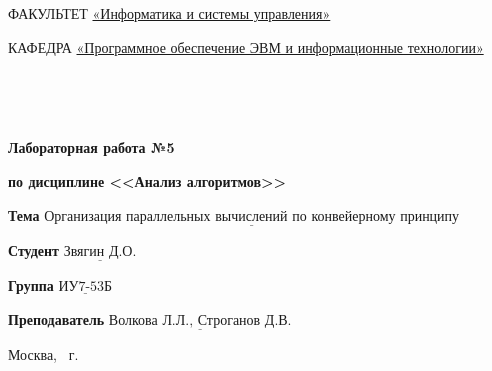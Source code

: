 \begin{titlepage}
	\noindent ФАКУЛЬТЕТ \underline{«Информатика и системы управления»}
	
	\noindent КАФЕДРА \underline{«Программное обеспечение ЭВМ и информационные технологии»}
	
	\
	
	\
	
	\begin{center}
	\noindent\begin{minipage}{1.0\textwidth}\centering
	\Large\textbf{Лабораторная работа №5}
	
	\textbf{по дисциплине <<Анализ алгоритмов>>}
	
	\end{minipage}
	\end{center}
	\noindent\textbf{Тема} $\underline{\text{Организация параллельных вычислений по конвейерному принципу}}$
	
	\noindent\textbf{Студент} $\underline{\text{Звягин Д.О.}}$
	
	\noindent\textbf{Группа} $\underline{\text{ИУ7-53Б}}$
	
	\noindent\textbf{Преподаватель} $\underline{\text{Волкова Л.Л., Строганов Д.В.}}$
	
	\begin{center}
	\mbox{}
	\vfill
	Москва, \the\year~г.
	\end{center}
	\clearpage
	\end{titlepage}